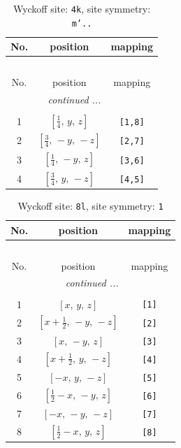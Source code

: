 \documentclass[fleqn,8pt]{jsarticle}
\begin{document}
\renewcommand{\arraystretch}{1.2}
\begin{longtable}{ccc}
\caption{Wyckoff site: {\tt 4k}, site symmetry: {\tt m'..}}
 \\
 \hline \hline
No. & position & mapping \\ \hline \endfirsthead

\multicolumn{2}{l}{\tablename\ \thetable{}} \\
 \hline \hline
No. & position & mapping \\ \hline \endhead

 \hline \hline
\multicolumn{2}{r}{\footnotesize\it continued ...} \\ \endfoot

 \hline \hline
\multicolumn{2}{r}{} \\ \endlastfoot

1 & $\left[ \frac{1}{4},\, y,\, z \right]$ & {\tt [1,8]} \\ \hline
2 & $\left[ \frac{3}{4},\, - y,\, - z \right]$ & {\tt [2,7]} \\ \hline
3 & $\left[ \frac{1}{4},\, - y,\, z \right]$ & {\tt [3,6]} \\ \hline
4 & $\left[ \frac{3}{4},\, y,\, - z \right]$ & {\tt [4,5]} \\
\end{longtable}
\renewcommand{\arraystretch}{1.2}
\begin{longtable}{ccc}
\caption{Wyckoff site: {\tt 8l}, site symmetry: {\tt 1}}
 \\
 \hline \hline
No. & position & mapping \\ \hline \endfirsthead

\multicolumn{2}{l}{\tablename\ \thetable{}} \\
 \hline \hline
No. & position & mapping \\ \hline \endhead

 \hline \hline
\multicolumn{2}{r}{\footnotesize\it continued ...} \\ \endfoot

 \hline \hline
\multicolumn{2}{r}{} \\ \endlastfoot

1 & $\left[ x,\, y,\, z \right]$ & {\tt [1]} \\ \hline
2 & $\left[ x + \frac{1}{2},\, - y,\, - z \right]$ & {\tt [2]} \\ \hline
3 & $\left[ x,\, - y,\, z \right]$ & {\tt [3]} \\ \hline
4 & $\left[ x + \frac{1}{2},\, y,\, - z \right]$ & {\tt [4]} \\ \hline
5 & $\left[ - x,\, y,\, - z \right]$ & {\tt [5]} \\ \hline
6 & $\left[ \frac{1}{2} - x,\, - y,\, z \right]$ & {\tt [6]} \\ \hline
7 & $\left[ - x,\, - y,\, - z \right]$ & {\tt [7]} \\ \hline
8 & $\left[ \frac{1}{2} - x,\, y,\, z \right]$ & {\tt [8]} \\
\end{longtable}
\end{document}
